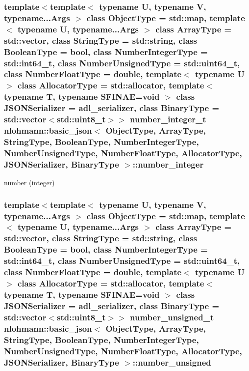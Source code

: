 \subsubsection[{\texorpdfstring{number\+\_\+integer}{number_integer}}]{\setlength{\rightskip}{0pt plus 5cm}template$<$template$<$ typename U, typename V, typename...\+Args $>$ class Object\+Type = std\+::map, template$<$ typename U, typename...\+Args $>$ class Array\+Type = std\+::vector, class String\+Type  = std\+::string, class Boolean\+Type  = bool, class Number\+Integer\+Type  = std\+::int64\+\_\+t, class Number\+Unsigned\+Type  = std\+::uint64\+\_\+t, class Number\+Float\+Type  = double, template$<$ typename U $>$ class Allocator\+Type = std\+::allocator, template$<$ typename T, typename S\+F\+I\+N\+A\+E=void $>$ class J\+S\+O\+N\+Serializer = adl\+\_\+serializer, class Binary\+Type  = std\+::vector$<$std\+::uint8\+\_\+t$>$$>$ {\bf number\+\_\+integer\+\_\+t} {\bf nlohmann\+::basic\+\_\+json}$<$ Object\+Type, Array\+Type, String\+Type, Boolean\+Type, Number\+Integer\+Type, Number\+Unsigned\+Type, Number\+Float\+Type, Allocator\+Type, J\+S\+O\+N\+Serializer, Binary\+Type $>$\+::number\+\_\+integer\hspace{0.3cm}{\ttfamily [private]}}\hypertarget{classnlohmann_1_1basic__json_ad88685d4cc24d7e86ddc5b0edb64192a}{}\label{classnlohmann_1_1basic__json_ad88685d4cc24d7e86ddc5b0edb64192a}


number (integer) 

\subsubsection[{\texorpdfstring{number\+\_\+unsigned}{number_unsigned}}]{\setlength{\rightskip}{0pt plus 5cm}template$<$template$<$ typename U, typename V, typename...\+Args $>$ class Object\+Type = std\+::map, template$<$ typename U, typename...\+Args $>$ class Array\+Type = std\+::vector, class String\+Type  = std\+::string, class Boolean\+Type  = bool, class Number\+Integer\+Type  = std\+::int64\+\_\+t, class Number\+Unsigned\+Type  = std\+::uint64\+\_\+t, class Number\+Float\+Type  = double, template$<$ typename U $>$ class Allocator\+Type = std\+::allocator, template$<$ typename T, typename S\+F\+I\+N\+A\+E=void $>$ class J\+S\+O\+N\+Serializer = adl\+\_\+serializer, class Binary\+Type  = std\+::vector$<$std\+::uint8\+\_\+t$>$$>$ {\bf number\+\_\+unsigned\+\_\+t} {\bf nlohmann\+::basic\+\_\+json}$<$ Object\+Type, Array\+Type, String\+Type, Boolean\+Type, Number\+Integer\+Type, Number\+Unsigned\+Type, Number\+Float\+Type, Allocator\+Type, J\+S\+O\+N\+Serializer, Binary\+Type $>$\+::number\+\_\+unsigned\hspace{0.3cm}{\ttfamily [private]}}\hypertarget{classnlohmann_1_1basic__json_a077b1e7977afafb97a6a38a3a617ba66}{}\label{classnlohmann_1_1basic__json_a077b1e7977afafb97a6a38a3a617ba66}


